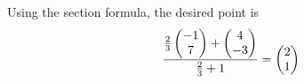 Using the section formula, 
the desired point is 
\begin{align}
\frac{\frac{2}{3}\begin{pmatrix}-1\\7\end{pmatrix}+\begin{pmatrix}4\\-3\end{pmatrix}}{\frac{2}{3}+1}
=\begin{pmatrix}2\\1\end{pmatrix}
\end{align}

